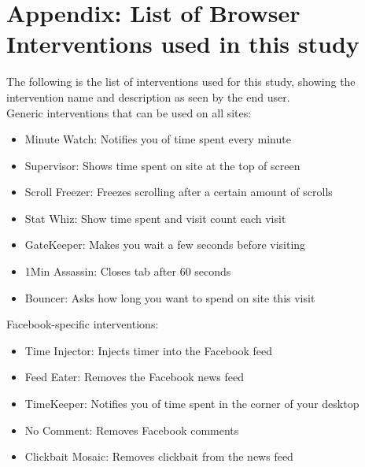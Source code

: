 \pagebreak

\section{Appendix: List of Browser Interventions used in this study}


The following is the list of interventions used for this study, showing the intervention name and description as seen by the end user.\\

Generic interventions that can be used on all sites:
\begin{small}
\begin{itemize}
    \item Minute Watch: Notifies you of time spent every minute
    \item Supervisor: Shows time spent on site at the top of screen
    \item Scroll Freezer: Freezes scrolling after a certain amount of scrolls
    \item Stat Whiz: Show time spent and visit count each visit
    \item GateKeeper: Makes you wait a few seconds before visiting
    \item 1Min Assassin: Closes tab after 60 seconds
    \item Bouncer: Asks how long you want to spend on site this visit
\end{itemize}
\end{small}
\vspace{2mm}

Facebook-specific interventions:

\begin{itemize}
    \item Time Injector: Injects timer into the Facebook feed
    \item Feed Eater: Removes the Facebook news feed
    \item TimeKeeper: Notifies you of time spent in the corner of your desktop
    \item No Comment: Removes Facebook comments
    \item Clickbait Mosaic: Removes clickbait from the news feed
\end{itemize}


